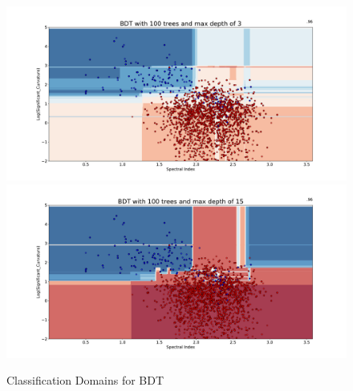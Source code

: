 \begin{figure}[h]
\includegraphics[width=\twopicsp\textwidth]{plots/classdom_bdt_100_3.pdf}
\includegraphics[width=\twopicsp\textwidth]{plots/classdom_bdt_100_15.pdf}
\caption{Classification Domains for BDT}
\label{fig:BDT_domains}
\end{figure}


